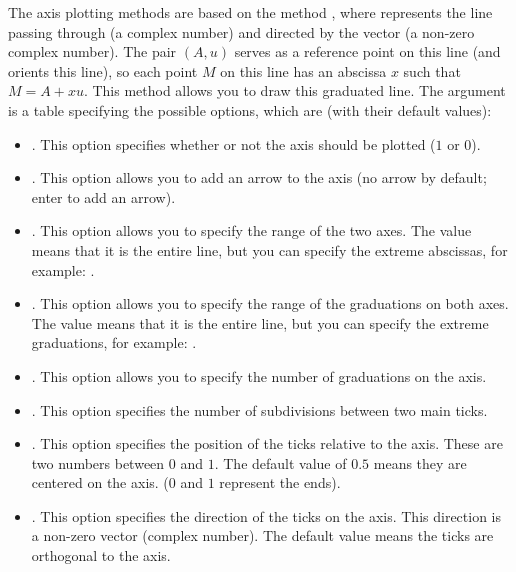 The axis plotting methods are based on the method , where  represents the line passing through  (a complex number) and directed by the vector  (a non-zero complex number). The pair $(A,u)$ serves as a reference point on this line (and orients this line), so each point $M$ on this line has an abscissa $x$ such that $M=A+xu$. This method allows you to draw this graduated line. The argument  is a table specifying the possible options, which are (with their default values):
\begin{itemize}
    \item {}. This option specifies whether or not the axis should be plotted ($1$ or $0$).

     \item {}. This option allows you to add an arrow to the axis (no arrow by default; enter  to add an arrow).

    \item {}. This option allows you to specify the range of the two axes. The value  means that it is the entire line, but you can specify the extreme abscissas, for example: .

    \item {}. This option allows you to specify the range of the graduations on both axes. The value  means that it is the entire line, but you can specify the extreme graduations, for example: .

    \item {}. This option allows you to specify the number of graduations on the axis.

    \item {}. This option specifies the number of subdivisions between two main ticks.

    \item {}. This option specifies the position of the ticks relative to the axis. These are two numbers between $0$ and $1$. The default value of $0.5$ means they are centered on the axis. ($0$ and $1$ represent the ends).

    \item {}. This option specifies the direction of the ticks on the axis. This direction is a non-zero vector (complex number). The default value  means the ticks are orthogonal to the axis.


\end{itemize}
